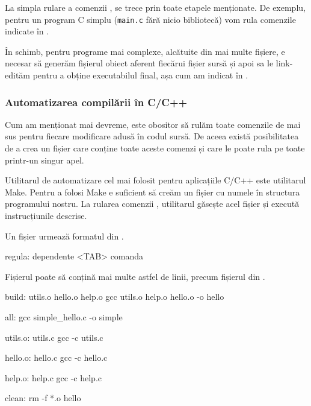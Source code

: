 La simpla rulare a comenzii , se trece prin toate etapele menționate.
De exemplu, pentru un program C simplu (\texttt{main.c} fără nicio bibliotecă) vom rula comenzile indicate în .

În schimb, pentru programe mai complexe, alcătuite din mai multe fișiere, e
necesar să generăm fișierul obiect aferent fiecărui fișier sursă și apoi sa le
link-edităm pentru a obține executabilul final, așa cum am indicat în .

\subsubsection{Automatizarea compilării în C/C++}
\label{sec:appdev:dev-env:c-dev}

Cum am menționat mai devreme, este obositor să rulăm toate comenzile de mai sus
pentru fiecare modificare adusă în codul sursă. De aceea există posibilitatea de
a crea un fișier care conține toate aceste comenzi și care le poate rula pe
toate printr-un singur apel.

Utilitarul de automatizare cel mai folosit pentru aplicațiile C/C++ este utilitarul Make.
Pentru a folosi Make e suficient să creăm un fișier cu numele  în
structura programului nostru. La rularea comenzii , utilitarul găsește
acel fișier și execută instrucțiunile descrise.

Un fișier  urmează formatul din .

\begin{screen}[caption={Formatul unui fișier Maefile},label={lst:appdev:makefile-format}]
regula: dependente
<TAB> comanda
\end{screen}

Fișierul poate să conțină mai multe astfel de linii, precum fișierul  din .

\begin{screen}[caption={Exemplu Makefile},label={lst:appdev:makefile}]
build: utils.o hello.o help.o
       gcc utils.o help.o hello.o -o hello

all:
       gcc simple_hello.c -o simple

utils.o: utils.c
       gcc -c utils.c

hello.o: hello.c
       gcc -c hello.c

help.o: help.c
       gcc -c help.c

clean:
       rm -f *.o hello
\end{screen}


